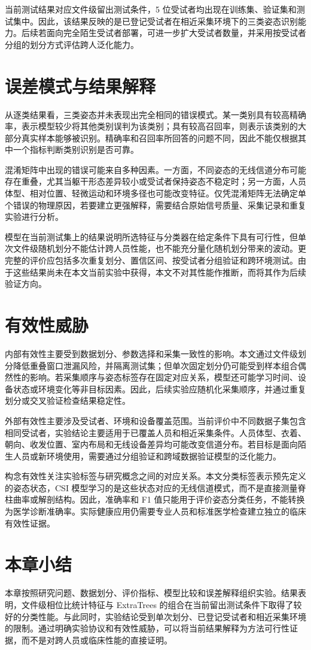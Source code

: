 当前测试结果对应文件级留出测试条件，5 位受试者均出现在训练集、验证集和测试集中。因此，该结果反映的是已登记受试者在相近采集环境下的三类姿态识别能力。后续若面向完全陌生受试者部署，可进一步扩大受试者数量，并采用按受试者分组的划分方式评估跨人泛化能力。

\section{误差模式与结果解释}
从逐类结果看，三类姿态并未表现出完全相同的错误模式。某一类别具有较高精确率，表示模型较少将其他类别误判为该类别；具有较高召回率，则表示该类别的大部分真实样本能够被识别。精确率和召回率所回答的问题不同，因此不能仅根据其中一个指标判断类别识别是否可靠。

混淆矩阵中出现的错误可能来自多种因素。一方面，不同姿态的无线信道分布可能存在重叠，尤其当躯干形态差异较小或受试者保持姿态不稳定时；另一方面，人员体型、相对位置、轻微运动和环境多径也可能改变特征。仅凭混淆矩阵无法确定单个错误的物理原因，若要建立更强解释，需要结合原始信号质量、采集记录和重复实验进行分析。

模型在当前测试集上的结果说明所选特征与分类器在给定条件下具有可行性，但单次文件级随机划分不能估计跨人员性能，也不能充分量化随机划分带来的波动。更完整的评价应包括多次重复划分、置信区间、按受试者分组验证和跨环境测试。由于这些结果尚未在本文当前实验中获得，本文不对其性能作推断，而将其作为后续验证方向。

\section{有效性威胁}
内部有效性主要受到数据划分、参数选择和采集一致性的影响。本文通过文件级划分降低重叠窗口泄漏风险，并隔离测试集；但单次固定划分仍可能受到样本组合偶然性的影响。若采集顺序与姿态标签存在固定对应关系，模型还可能学习时间、设备状态或环境变化等非目标因素。因此，后续实验应随机化采集顺序，并通过重复划分或交叉验证检查结果稳定性。

外部有效性主要涉及受试者、环境和设备覆盖范围。当前评价中不同数据子集包含相同受试者，实验结论主要适用于已覆盖人员和相近采集条件。人员体型、衣着、朝向、收发位置、室内布局和无线设备差异均可能改变信道分布。若目标是面向陌生人员或新环境使用，需要通过分组验证和跨域数据验证模型的泛化能力。

构念有效性关注实验标签与研究概念之间的对应关系。本文分类标签表示预先定义的姿态状态，CSI 模型学习的是这些状态对应的无线信道模式，而不是直接测量脊柱曲率或解剖结构。因此，准确率和 F1 值只能用于评价姿态分类任务，不能转换为医学诊断准确率。实际健康应用仍需要专业人员和标准医学检查建立独立的临床有效性证据。

\section{本章小结}
本章按照研究问题、数据划分、评价指标、模型比较和误差解释组织实验。结果表明，文件级相位比统计特征与 ExtraTrees 的组合在当前留出测试条件下取得了较好的分类性能。与此同时，实验结论受到单次划分、已登记受试者和相近采集环境的限制。通过明确实验协议和有效性威胁，可以将当前结果解释为方法可行性证据，而不是对跨人员或临床性能的直接证明。

